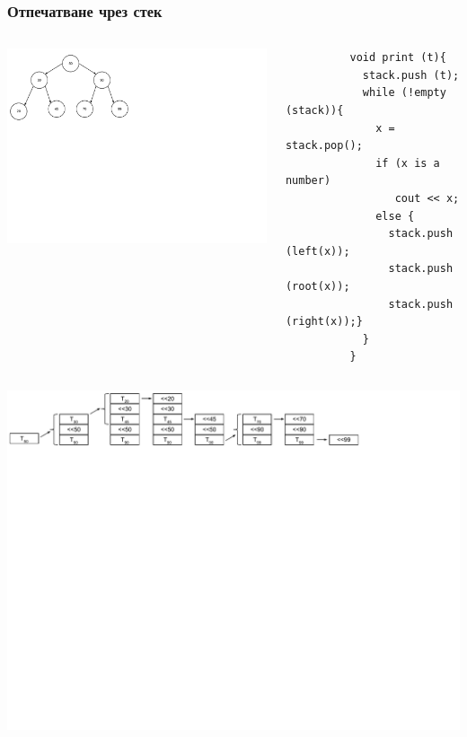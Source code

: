 \documentclass{beamer}
\begin{document}
\begin{frame}[fragile]
\frametitle{Отпечатване чрез стек}


\begin{columns}[t]
  \begin{column}{0.4\textwidth}

\includegraphics[width=11cm]{images/tree_bot_clean}
  \end{column}
  \begin{column}{0.6\textwidth}
  
      \begin{flushleft}
        \begin{lstlisting}
          void print (t){
            stack.push (t);
            while (!empty (stack)){
              x = stack.pop();
              if (x is a number) 
                 cout << x;
              else {
                stack.push (left(x)); 
                stack.push (root(x));
                stack.push (right(x));}
            }
          }
        \end{lstlisting}
      \end{flushleft}

  \end{column}
\end{columns}

\vspace{-120px}
\includegraphics[width=15cm]{images/tree_print_with_stack}


\end{frame}
\end{document}
